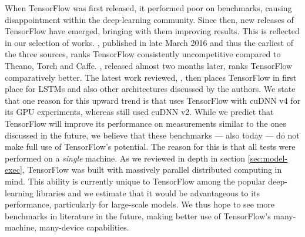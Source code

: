 When TensorFlow was first released, it performed poor on benchmarks, causing
disappointment within the deep-learning community. Since then, new releases of
TensorFlow have emerged, bringing with them improving results. This is reflected
in our selection of works. \cite{bosch}, published in late March 2016 and thus
the earliest of the three sources, ranks TensorFlow consistently uncompetitive
compared to Theano, Torch and Caffe. \cite{convnet-bench}, released almost two
months later, ranks TensorFlow comparatively better. The latest work reviewed,
\cite{theano}, then places TensorFlow in first place for LSTMs and also other
architectures discussed by the authors. We state that one reason for this upward
trend is that \cite{theano} uses TensorFlow with cuDNN v4 for its GPU
experiments, whereas \cite{bosch} still used cuDNN v2. While we predict that
TensorFlow will improve its performance on measurements similar to the ones
discussed in the future, we believe that these benchmarks --- also today --- do
not make full use of TensorFlow's potential. The reason for this is that all
tests were performed on a \emph{single} machine. As we reviewed in depth in
section \ref{sec:model-exec}, TensorFlow was built with massively parallel
distributed computing in mind. This ability is currently unique to TensorFlow
among the popular deep-learning libraries and we estimate that it would be
advantageous to its performance, particularly for large-scale models. We thus
hope to see more benchmarks in literature in the future, making better use of
TensorFlow's many-machine, many-device capabilities.

